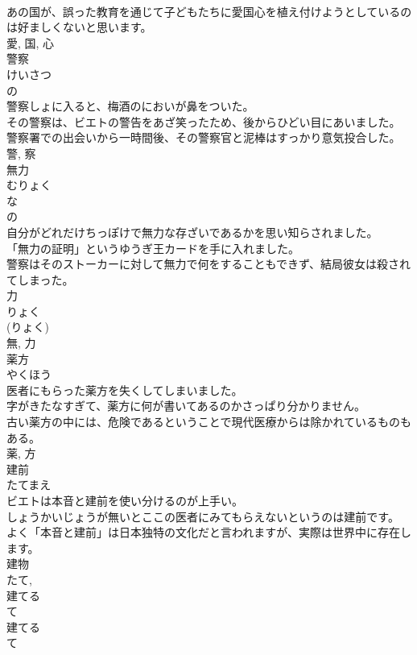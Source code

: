 \documentclass[8pt]{extreport}
\begin{document}
\begin{CJK}{UTF8}{min}
\\	あの国が、誤った教育を通じて子どもたちに愛国心を植え付けようとしているのは好ましくないと思います。	
\\	愛, 国, 心	
\\	警察	
\\	けいさつ	
\\	の 
\\	警察しょに入ると、梅酒のにおいが鼻をついた。	
\\	その警察は、ビエトの警告をあざ笑ったため、後からひどい目にあいました。	
\\	警察署での出会いから一時間後、その警察官と泥棒はすっかり意気投合した。	
\\	警, 察	
\\	無力	
\\	むりょく	
\\	な 
\\	の 
\\	自分がどれだけちっぽけで無力な存ざいであるかを思い知らされました。	
\\	「無力の証明」というゆうぎ王カードを手に入れました。	
\\	警察はそのストーカーに対して無力で何をすることもできず、結局彼女は殺されてしまった。	
\\	力 
\\	りょく 
\\	(りょく) 
\\	無, 力	
\\	薬方	
\\	やくほう	
\\	医者にもらった薬方を失くしてしまいました。	
\\	字がきたなすぎて、薬方に何が書いてあるのかさっぱり分かりません。	
\\	古い薬方の中には、危険であるということで現代医療からは除かれているものもある。	
\\	薬, 方	
\\	建前	
\\	たてまえ	
\\	ビエトは本音と建前を使い分けるのが上手い。	
\\	しょうかいじょうが無いとここの医者にみてもらえないというのは建前です。	
\\	よく「本音と建前」は日本独特の文化だと言われますが、実際は世界中に存在します。	
\\	建物 
\\	たて, 
\\	建てる 
\\	て 
\\	建てる 
\\	て 

\end{CJK}
\end{document}
